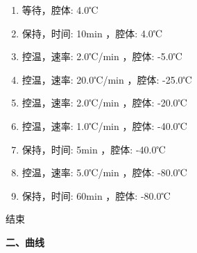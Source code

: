 \documentclass[UTF8,10pt,a4paper,fontset=fandol]{ctexart}
\newcommand{\fieldvalue}[1]{#1}
\begin{document}
\begin{enumerate}
\item 等待，腔体:
\fieldvalue{4.0℃}

\item 保持，时间:
\fieldvalue{10min}
，腔体:
\fieldvalue{4.0℃}

\item 控温，速率:
\fieldvalue{2.0℃/min}
，腔体:
\fieldvalue{-5.0℃}

\item 控温，速率:
\fieldvalue{20.0℃/min}
，腔体:
\fieldvalue{-25.0℃}

\item 控温，速率:
\fieldvalue{2.0℃/min}
，腔体:
\fieldvalue{-20.0℃}

\item 控温，速率:
\fieldvalue{1.0℃/min}
，腔体:
\fieldvalue{-40.0℃}

\item 保持，时间:
\fieldvalue{5min}
，腔体:
\fieldvalue{-40.0℃}

\item 控温，速率:
\fieldvalue{5.0℃/min}
，腔体:
\fieldvalue{-80.0℃}

\item 保持，时间:
\fieldvalue{60min}
，腔体:
\fieldvalue{-80.0℃}
\end{enumerate}

\noindent
结束

\medskip

\noindent\textbf{二、曲线}

\begin{center}
\end{center}
\end{document}
